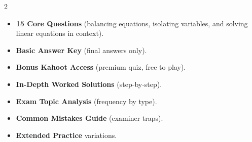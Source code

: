 \documentclass[11pt,a4paper]{article}
\newcommand{\FullReleaseDate}{April 30, 2026}
\begin{document}
\vspace{8pt}

\begin{multicols}{2}
  \begin{tcolorbox}[card, title=\sffamily\bfseries\textcolor{white}{\faHandPointDown\ TODAY (Simplified Version)}, colbacktitle=mainblue, boxed title style={sharp corners, boxrule=0pt}]
    \begin{itemize}[leftmargin=1.2em, itemsep=2pt]
      \item \small \textbf{15 Core Questions} (balancing equations, isolating variables, and solving linear equations in context).
      \item \small \textbf{Basic Answer Key} (final answers only).
      \item \small \textbf{Bonus Kahoot Access} (premium quiz, free to play).
    \end{itemize}
  \end{tcolorbox}

  \columnbreak

  \begin{tcolorbox}[card, title=\sffamily\bfseries\textcolor{white}{\faRocket\ ON \FullReleaseDate\ (Full Upgrade)}, colbacktitle=mainblue, boxed title style={sharp corners, boxrule=0pt}]
    \begin{itemize}[leftmargin=1.2em, itemsep=2pt]
      \item \small \textbf{In-Depth Worked Solutions} (step-by-step).
      \item \small \textbf{Exam Topic Analysis} (frequency by type).
      \item \small \textbf{Common Mistakes Guide} (examiner traps).
      \item \small \textbf{Extended Practice} variations.
    \end{itemize}
  \end{tcolorbox}
\end{multicols}
\end{document}

